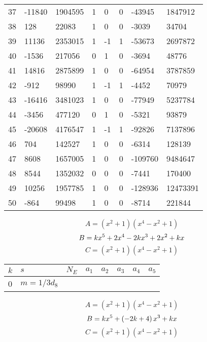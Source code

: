\documentclass{amsart}
\begin{document}
\begin{longtable}{|l|l|l|lllll|}
37&-11840&1904595&1&0&0&-43945&1847912\\
38&128&22083&1&0&0&-3039&34704\\
39&11136&2353015&1&-1&1&-53673&2697872\\
40&-1536&217056&0&1&0&-3694&48776\\
41&14816&2875899&1&0&0&-64954&3787859\\
42&-912&98990&1&-1&1&-4452&70979\\
43&-16416&3481023&1&0&0&-77949&5237784\\
44&-3456&477120&0&1&0&-5321&93879\\
45&-20608&4176547&1&-1&1&-92826&7137896\\
46&704&142527&1&0&0&-6314&128139\\
47&8608&1657005&1&0&0&-109760&9484647\\
48&8544&1352032&0&0&0&-7441&170400\\
49&10256&1957785&1&0&0&-128936&12473391\\
50&-864&99498&1&0&0&-8714&221844\\
\hline
\end{longtable}
$$A=(x^2
 + 1)(x^4
 - x^2
 + 1)$$
$$B=k\*x^5
 + 2\*x^4
 - 2\*k\*x^3
 + 2\*x^2
 + k\*x$$
$$C=(x^2
 + 1)(x^4
 - x^2
 + 1)$$
\begin{longtable}{|l|l|l|lllll|}
\hline
$k$ & $s$ & $N_E$ & $a_1$ & $a_2$ & $a_3$ & $a_4$ & $a_5$\\
\hline
0&$m=1/3d_{8}$&&\multicolumn{5}{c|}{}\\
\hline
\end{longtable}
$$A=(x^2
 + 1)(x^4
 - x^2
 + 1)$$
$$B=k\*x^5
 + \left(-2\*k
 + 4\right) \*x^3
 + k\*x$$
$$C=(x^2
 + 1)(x^4
 - x^2
 + 1)$$
\end{document}
